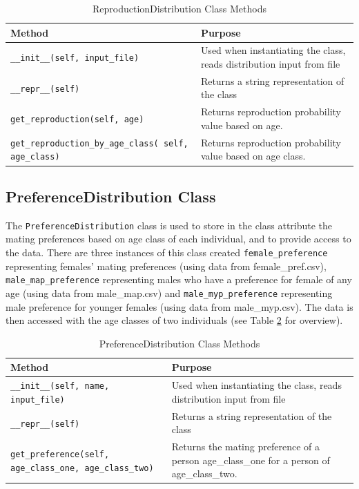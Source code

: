\documentclass[authoryearcitations]{UoYCSproject}
\begin{document}
\begin{table}[h]
\caption{ReproductionDistribution Class Methods}
\label{tbl:reproductionDistributionMethods}
\begin{tabular}{m{} m{}}
\textbf{Method} & \textbf{Purpose} \\\hline
\texttt{\_\_init\_\_(self, input\_file)} & Used when instantiating the class, reads distribution input from file\\\hline
\texttt{\_\_repr\_\_(self)} & Returns a string representation of the class \\\hline
\texttt{get\_reproduction(self, age)} & Returns reproduction probability value based on age.\\\hline
\small\texttt{get\_reproduction\_by\_age\_class( self, age\_class)} \normalsize &  Returns reproduction probability value based on age class.
\end{tabular}
\end{table}

\newpage
\subsection{PreferenceDistribution Class}
The \texttt{PreferenceDistribution} class is used to store in the class attribute \texttt{} the mating preferences based on age class of each individual, and to provide access to the data. There are three instances of this class created \texttt{female\_preference} representing females' mating preferences (using data from female\_pref.csv), \texttt{male\_map\_preference} representing males who have a preference for female of any age (using data from male\_map.csv) and \texttt{male\_myp\_preference} representing male preference for younger females (using data from male\_myp.csv). The data is then accessed with the age classes of two individuals (see Table \ref{tbl:preferenceDistributionMethods} for overview).

\begin{table}[h]
\caption{PreferenceDistribution Class Methods}
\label{tbl:preferenceDistributionMethods}
\begin{tabular}{m{} m{}}
\textbf{Method} & \textbf{Purpose} \\\hline
\texttt{\_\_init\_\_(self, name, input\_file)} & Used when instantiating the class, reads distribution input from file\\\hline
\texttt{\_\_repr\_\_(self)} & Returns a string representation of the class \\\hline
\texttt{get\_preference(self, age\_class\_one, age\_class\_two)} & Returns the mating preference of a person age\_class\_one for a person of age\_class\_two.
\end{tabular}
\end{table}
\end{document}
